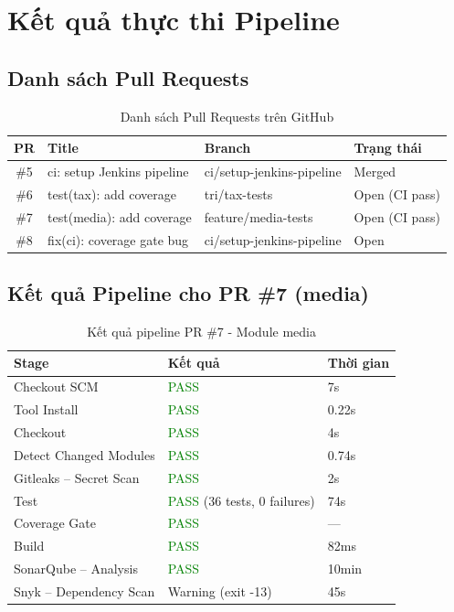 \section{Kết quả thực thi Pipeline}

\subsection{Danh sách Pull Requests}
\begin{table}[H]
\centering
\caption{Danh sách Pull Requests trên GitHub}
\begin{tabular}{|c|l|l|l|}
\hline
\textbf{PR} & \textbf{Title} & \textbf{Branch} & \textbf{Trạng thái} \\
\hline
\#5 & ci: setup Jenkins pipeline & ci/setup-jenkins-pipeline & Merged \\
\hline
\#6 & test(tax): add coverage & tri/tax-tests & Open (CI pass) \\
\hline
\#7 & test(media): add coverage & feature/media-tests & Open (CI pass) \\
\hline
\#8 & fix(ci): coverage gate bug & ci/setup-jenkins-pipeline & Open \\
\hline
\end{tabular}
\end{table}


\subsection{Kết quả Pipeline cho PR \#7 (media)}
\begin{table}[H]
\centering
\caption{Kết quả pipeline PR \#7 - Module media}
\begin{tabular}{|l|l|l|}
\hline
\textbf{Stage} & \textbf{Kết quả} & \textbf{Thời gian} \\
\hline
Checkout SCM & \textcolor{green}{PASS} & 7s \\
\hline
Tool Install & \textcolor{green}{PASS} & 0.22s \\
\hline
Checkout & \textcolor{green}{PASS} & 4s \\
\hline
Detect Changed Modules & \textcolor{green}{PASS} & 0.74s \\
\hline
Gitleaks -- Secret Scan & \textcolor{green}{PASS} & 2s \\
\hline
Test & \textcolor{green}{PASS} (36 tests, 0 failures) & 74s \\
\hline
Coverage Gate & \textcolor{green}{PASS} & --- \\
\hline
Build & \textcolor{green}{PASS} & 82ms \\
\hline
SonarQube -- Analysis & \textcolor{green}{PASS} & 10min \\
\hline
Snyk -- Dependency Scan & Warning (exit -13) & 45s \\
\hline
\end{tabular}
\end{table}

